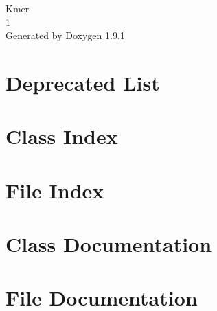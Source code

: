 \let\mypdfximage\pdfximage\def\pdfximage{\immediate\mypdfximage}\documentclass[twoside]{book}
\newcommand{\+}{\discretionary{\mbox{\scriptsize$\hookleftarrow$}}{}{}}
\newcommand{\clearemptydoublepage}{%
  \newpage{\pagestyle{empty}\cleardoublepage}%
}
\begin{document}
\raggedbottom

\hypersetup{pageanchor=false,
             bookmarksnumbered=true,
             pdfencoding=unicode
            }
\begin{titlepage}
\vspace*{7cm}
\begin{center}%
{\Large Kmer \\[1ex]\large 1 }\\
\vspace*{1cm}
{\large Generated by Doxygen 1.9.1}\\
\end{center}
\end{titlepage}
\clearemptydoublepage
{}
\tableofcontents
\clearemptydoublepage
{}
\hypersetup{pageanchor=true}

\chapter{Deprecated List}
\label{deprecated}

\chapter{Class Index}

\chapter{File Index}

\chapter{Class Documentation}


\chapter{File Documentation}







\backmatter
\newpage
{}
\clearemptydoublepage
{}
\printindex
\end{document}
